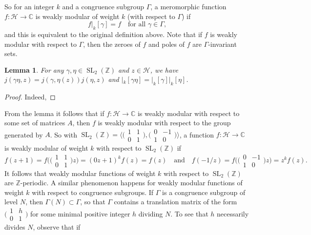 \documentclass[10pt,leqno,twoside]{article}
\theoremstyle{plain}
\newtheorem{lemma}[lem]{Lemma}
\theoremstyle{definition}
\numberwithin{equation}{section}
\numberwithin{lem}{section}
\newcommand{\textib}[1]{\textbf{\textit{#1\index{#1}}}} %
\DeclareMathOperator{\SL}{SL}
\newcommand{\slz}{\SL_2(\mathbb{Z})}
\newcommand{\tbd}{{\Huge\color{red}{\textib{TBD}}}}
\begin{document}
So for an integer $k$ and a congruence subgroup $\varGamma$, a meromorphic function $f\colon \mathcal H \to \mathbb{C}$ is weakly modular of weight $k$ (with respect to $\varGamma$) if \[f|_k[\gamma] = f\quad\text{for all }\gamma\in \varGamma,\] and this is equivalent to the original definition above. Note that if $f$ is weakly modular with respect to $\varGamma$, then the zeroes of $f$ and poles of $f$ are $\varGamma$-invariant sets.

\begin{lemma}\label{lem: props of automorphy}
    For any $\gamma,\eta\in \slz$ and $z\in \mathcal H$, we have $j(\gamma\eta,z) = j(\gamma,\eta(z))j(\eta,z)$ and $|_k[\gamma\eta] = |_k[\gamma]|_k[\eta]$.
\end{lemma}
\begin{proof}
    Indeed, \tbd
\end{proof}
From the lemma it follows that if $f\colon \mathcal H\to\mathbb C$ is weakly modular with respect to some set of matrices $A$, then $f$ is weakly modular with respect to the group generated by $A$. So with $\slz = \big\langle\big(\!\begin{smallmatrix}
    1 & 1 \\ 0 & 1
\end{smallmatrix}\!\big), \big(\!\begin{smallmatrix}
    0 & -1 \\ 1 & 0
\end{smallmatrix}\!\big)\big\rangle$, a function $f\colon \mathcal H\to \mathbb C$ is weakly modular of weight $k$ with respect to $\slz$ if
\[f(z+1) = f\big(\big(\!\begin{smallmatrix}
    1 & 1 \\ 0 & 1
\end{smallmatrix}\!\big)z\big) = (0z+1)^kf(z) = f(z)\quad\text{and}\quad f(-1/z) = f\big(\big(\!\begin{smallmatrix}
    0 & -1 \\ 1 & 0
\end{smallmatrix}\!\big)z\big) = z^kf(z).\] It follows that weakly modular functions of weight $k$ with respect to $\slz$ are $\mathbb Z$-periodic. A similar phenomenon happens for weakly modular functions of weight $k$ with respect to congruence subgroups. If $\varGamma$ is a congruence subgroup of level $N$, then $\varGamma(N)\subset \varGamma$, so that $\varGamma$ contains a translation matrix of the form $\big(\!\begin{smallmatrix}
    1 & h \\ 0 & 1
\end{smallmatrix}\!\big)$ for some minimal positive integer $h$ dividing $N$. To see that $h$ necessarily divides $N$, observe that if 
\end{document}
